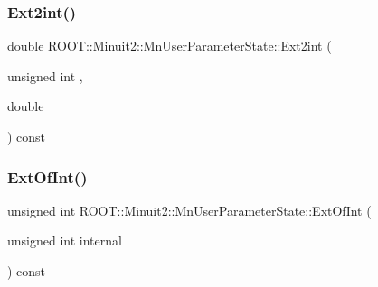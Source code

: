 \subsubsection{\texorpdfstring{Ext2int()}{Ext2int()}\hspace{0.1cm}{\footnotesize\ttfamily [2/2]}}
{\footnotesize\ttfamily double R\+O\+O\+T\+::\+Minuit2\+::\+Mn\+User\+Parameter\+State\+::\+Ext2int (\begin{DoxyParamCaption}\item[{unsigned int}]{,  }\item[{double}]{ }\end{DoxyParamCaption}) const}

\mbox{\label{classROOT_1_1Minuit2_1_1MnUserParameterState_a9ab7bee2faaac9a607d090eb11926150}} 
\subsubsection{\texorpdfstring{ExtOfInt()}{ExtOfInt()}\hspace{0.1cm}{\footnotesize\ttfamily [1/2]}}
{\footnotesize\ttfamily unsigned int R\+O\+O\+T\+::\+Minuit2\+::\+Mn\+User\+Parameter\+State\+::\+Ext\+Of\+Int (\begin{DoxyParamCaption}\item[{unsigned int}]{internal }\end{DoxyParamCaption}) const}

